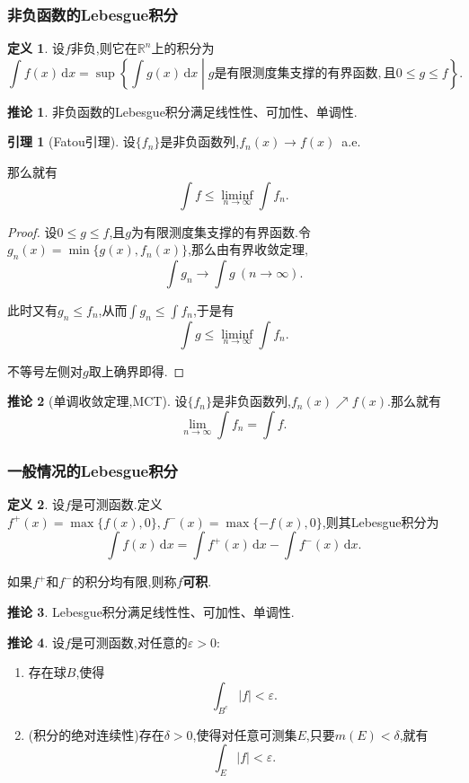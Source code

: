 \documentclass{ctexart}
\theoremstyle{definition}
\newtheorem{definition}{定义}
\newtheorem{lemma}{引理}
\newtheorem{corollary}{推论}
\theoremstyle{remark}
\begin{document}
	\subsubsection{非负函数的Lebesgue积分}
	\begin{definition}
		设$f$非负,则它在$\mathbb{R}^n$上的积分为
		$$\int{f(x)\,\mathrm{d}x}=\sup\left\{\int{g(x)\,\mathrm{d}x} \middle| g\mbox{是有限测度集支撑的有界函数},\mbox{且}0\le g\le f\right\}.$$
	\end{definition}
	\begin{corollary}
		非负函数的Lebesgue积分满足线性性、可加性、单调性.
	\end{corollary}
	
	\begin{lemma}[Fatou引理]
		设$\{f_n\}$是非负函数列,$f_n(x)\to f(x)$\ a.e.
		
		那么就有
		$$\int{f}\le\liminf_{n\to\infty}{\int{f_n}}.$$
	\end{lemma}
	\begin{proof}
		设$0\le g\le f$,且$g$为有限测度集支撑的有界函数.令$g_n(x)=\min\{g(x),f_n(x)\}$,那么由有界收敛定理,
		$$\int{g_n}\to\int{g}\ (n\to\infty).$$
		
		此时又有$g_n\le f_n$,从而$\int{g_n}\le\int{f_n}$,于是有
		$$\int{g}\le\liminf_{n\to\infty}{\int{f_n}}.$$
		
		不等号左侧对$g$取上确界即得.
	\end{proof}
	\begin{corollary}[单调收敛定理,MCT]
		设$\{f_n\}$是非负函数列,$f_n(x)\nearrow f(x)$.那么就有
		$$\lim_{n\to\infty}{\int{f_n}}=\int{f}.$$
	\end{corollary}
	
	\subsubsection{一般情况的Lebesgue积分}
	\begin{definition}
		设$f$是可测函数.定义$f^+(x)=\max\{f(x),0\},f^-(x)=\max\{-f(x),0\}$,则其Lebesgue积分为
		$$\int{f(x)\,\mathrm{d}x}=\int{f^+(x)\,\mathrm{d}x}-\int{f^-(x)\,\mathrm{d}x}.$$
		
		如果$f^+$和$f^-$的积分均有限,则称$f$\textbf{可积}.
	\end{definition}
	\begin{corollary}
		Lebesgue积分满足线性性、可加性、单调性.
	\end{corollary}
	\begin{corollary}\label{thm_integral_property}
		设$f$是可测函数,对任意的$\varepsilon>0$:
		\begin{enumerate}
			\item 存在球$B$,使得$$\int_{B^c}{|f|}<\varepsilon.$$
			\item (积分的绝对连续性)存在$\delta>0$,使得对任意可测集$E$,只要$m(E)<\delta$,就有$$\int_E{|f|}<\varepsilon.$$
		\end{enumerate}
	\end{corollary}
	
\end{document}
